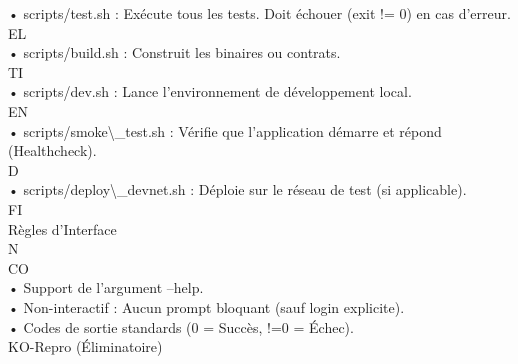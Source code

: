 \documentclass[12pt,landscape,a4paper]{article}
\begin{document}
\vspace{0.5em}
• scripts/test.sh : Exécute tous les tests. Doit échouer (exit != 0) en cas d’erreur.\\
\vspace{0.5em}
\vspace{0.5em}
\vspace{0.5em}
\vspace{0.5em}
EL\\
• scripts/build.sh : Construit les binaires ou contrats.\\
\vspace{0.5em}
\vspace{0.5em}
\vspace{0.5em}
\vspace{0.5em}
TI\\
• scripts/dev.sh : Lance l’environnement de développement local.\\
\vspace{0.5em}
\vspace{0.5em}
\vspace{0.5em}
\vspace{0.5em}
EN\\
• scripts/smoke\textbackslash{}_test.sh : Vérifie que l’application démarre et répond (Healthcheck).\\
\vspace{0.5em}
\vspace{0.5em}
\vspace{0.5em}
\vspace{0.5em}
D\\
• scripts/deploy\textbackslash{}_devnet.sh : Déploie sur le réseau de test (si applicable).\\
\vspace{0.5em}
\vspace{0.5em}
\vspace{0.5em}
\vspace{0.5em}
FI\\
Règles d’Interface\\
N\\
CO\\
• Support de l’argument --help.\\
\vspace{0.5em}
• Non-interactif : Aucun prompt bloquant (sauf login explicite).\\
\vspace{0.5em}
• Codes de sortie standards (0 = Succès, !=0 = Échec).\\
\vspace{0.5em}
KO-Repro (Éliminatoire)\\
\end{document}

